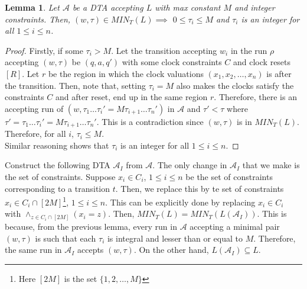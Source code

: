 \documentclass[a4paper,12pt]{article}
\theoremstyle{break}
\newtheorem{lemma}[theorem]{Lemma}
\begin{document}
\begin{lemma}
    Let $\mathcal{A}$ be a DTA accepting $L$ with max constant $M$ and integer constraints. Then, $(w,\tau)\in MIN_T(L) \implies$ $0\leq\tau_i\leq M$ and $\tau_i$ is an integer for all $1\leq i\leq n$.
\end{lemma}
\begin{proof}
    Firstly, if some $\tau_i> M$. Let the transition accepting $w_i$ in the run $\rho$ accepting $(w,\tau)$ be $(q,a,q')$ with some clock constraints $C$ and clock resets $[R]$. Let $r$ be the region in which the clock valuations $(x_1,x_2,\dots,x_n)$ is after the transition. Then, note that, setting $\tau_i=M$ also makes the clocks satisfy the constraints $C$ and after reset, end up in the same region $r$. Therefore, there is an accepting run of $(w,\tau_1\dots\tau_i'=M\tau_{i+1}\dots \tau_n')$ in $\mathcal{A}$ and $\tau'<\tau$ where $\tau'=\tau_1\dots\tau_i'=M\tau_{i+1}\dots \tau_n'$. This is a contradiction since $(w,\tau)$ is in $MIN_T(L)$. Therefore, for all $i$, $\tau_i\leq M$.\\

    Similar reasoning shows that $\tau_i$ is an integer for all $1\leq i\leq n$.
\end{proof}

Construct the following DTA $\mathcal{A}_I$ from $\mathcal{A}$. The only change in $\mathcal{A}_I$ that we make is the set of constraints. Suppose $x_i \in C_i$, $1\leq i\leq n$ be the set of constraints corresponding to a transition $t$. Then, we replace this by te set of constraints $x_i \in C_i\cap [2M]$\footnote{Here $[2M]$ is the set $\{1,2,\dots, M\}$}, $1\leq i\leq n$. This can be explicitly done by replacing $x_i\in C_i$ with $\wedge_{z\in C_i\cap [2M]} (x_i=z)$. Then, $MIN_T(L) = MIN_T(L(\mathcal{A}_I))$. This is because, from the previous lemma, every run in $\mathcal{A}$ accepting a minimal pair $(w,\tau)$ is such that each $\tau_i$ is integral and lesser than or equal to $M$. Therefore, the same run in $\mathcal{A}_I$ accepts $(w,\tau)$. On the other hand, $L(\mathcal{A}_I)\subseteq L$.\\
\end{document}
